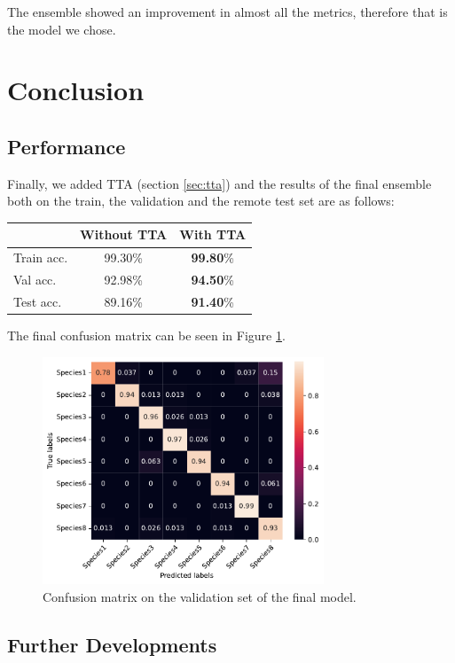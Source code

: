 \documentclass[conference,compsoc,11pt]{IEEEtran}
\begin{document}
The ensemble showed an improvement in almost all the metrics, therefore that is the model we chose.

\section{Conclusion}

\subsection{Performance}

Finally, we added TTA (section \ref{sec:tta}) and the results of the final ensemble both on the train, the validation and the remote test set are as follows:

\begin{center}
\begin{tabular}{ l c c }
\hline\hline
           & Without TTA & With TTA \\
\hline
Train acc. & 99.30\%     & \textbf{99.80}\% \\
Val acc.   & 92.98\%     & \textbf{94.50}\% \\
Test acc.  & 89.16\%     & \textbf{91.40}\% \\
\hline\hline
\end{tabular}

\end{center}

\noindent The final confusion matrix can be seen in Figure \ref{fig:confusion}.

\begin{figure}[h!]
\centering
\includegraphics[width=3.3in]{confusion}
\caption{Confusion matrix on the validation set of the final model.}
\label{fig:confusion}
\end{figure}

\subsection{Further Developments}
\end{document}

